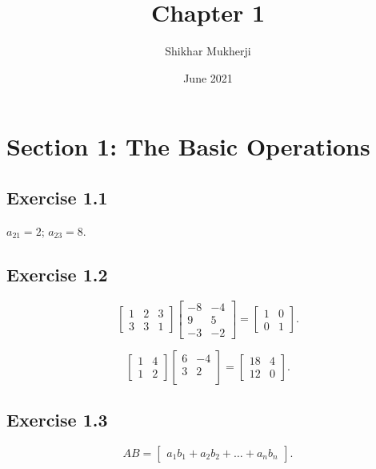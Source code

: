 \documentclass{article}
\title{Chapter 1}
\author{Shikhar Mukherji}
\date{June 2021}
\begin{document}
\maketitle

\section*{Section 1: The Basic Operations}

\subsection*{Exercise 1.1}

$a_{21}=2$; $a_{23}=8$.

\subsection*{Exercise 1.2}

\[
    \begin{bmatrix}
    1 & 2 & 3\\
    3 & 3 & 1
    \end{bmatrix}
    \begin{bmatrix}
    -8 & -4\\
    9 & 5\\
    -3 & -2
    \end{bmatrix}
    =
    \begin{bmatrix}
    1 & 0\\
    0 & 1
    \end{bmatrix}.
\]

\[
    \begin{bmatrix}
    1 & 4\\
    1 & 2
    \end{bmatrix}
    \begin{bmatrix}
    6 & -4\\
    3 & 2\\
    \end{bmatrix}
    =
    \begin{bmatrix}
    18 & 4\\
    12 & 0
    \end{bmatrix}.
\]

\subsection*{Exercise 1.3}

\[
    AB
    =
    \begin{bmatrix}
    a_1 b_1 + a_2 b_2 + \dots + a_n b_n
    \end{bmatrix}.
\]
\end{document}

